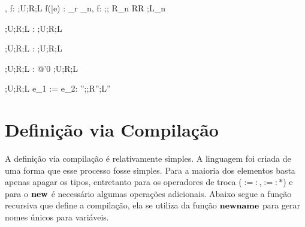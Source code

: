 	{\Gamma, f: \tau;U;R;L \vdash f(\bar e) : \tau_r \OR
	\Gamma_n, f: \tau ;\emptyset; R_n \cup RR ;L_n} 

\infrule[Stop]
	{}
	{\Gamma;U;R;L \vdash {}:  \OR \Gamma;U;R;L} 

\infrule[NullPtr]
	{}
	{\Gamma;U;R;L \vdash {}\typearg{\tau}: \text{*}\tau \OR \Gamma;U;R;L} 

\infrule[NullAlias]
	{}
	{\Gamma;U;R;L \vdash {}\typearg{\tau}: @\tau'0 \OR \Gamma;U;R;L} 

	{\Gamma;U;R;L \vdash e_1 := e_2: \tau \OR \Gamma'';\emptyset;R'';L''} 



\section{Definição via Compilação}

A definição via compilação é relativamente simples. A linguagem foi criada de uma forma que esse processo fosse simples. Para a maioria dos elementos basta apenas apagar os tipos, entretanto para os operadores de troca ($:=:$,$:=:\!\!\text{*}$) e para o $\mathbf{new}$ é necessário algumas operações adicionais. Abaixo segue a função recursiva que define a compilação, ela se utiliza da função $\mathbf{newname}$ para gerar nomes únicos para variáveis.

